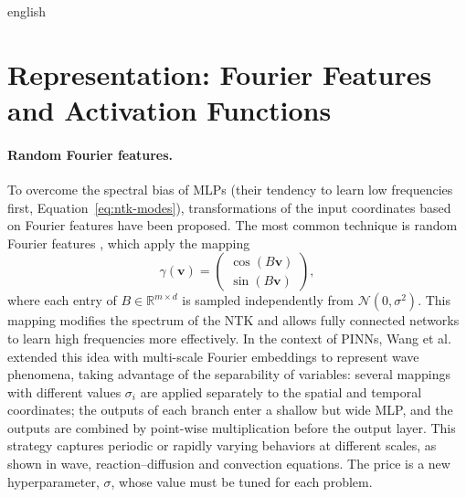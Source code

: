 \documentclass[0000.tex]{subfiles}
\begin{document}
\begin{hyphenrules}{english}
\section{Representation: Fourier Features and Activation Functions}\label{sec:representation}

\paragraph{Random Fourier features.}
To overcome the spectral bias of MLPs (their tendency to learn low frequencies first,
Equation~\eqref{eq:ntk-modes}), transformations of the input coordinates based on Fourier features have been
proposed. The most common technique is random Fourier features \cite{tancik2020}, which apply the
mapping
\begin{equation}
  \gamma(\mathbf{v})=\begin{pmatrix}\cos(B\mathbf{v})\\ \sin(B\mathbf{v})\end{pmatrix},
  \label{eq:fourier-features}
\end{equation}
where each entry of $B\in\mathbb{R}^{m\times d}$ is sampled independently from $\mathcal{N}(0,\sigma^2)$. This mapping
modifies the spectrum of the NTK and allows fully connected networks to learn high frequencies more
effectively. In the context of PINNs, Wang et al.~\cite{wang2021eigenvector} extended this idea with multi-scale
Fourier embeddings to represent wave phenomena, taking advantage of the separability of variables: several
mappings with different values $\sigma_i$ are applied separately to the spatial and temporal coordinates;
the outputs of each branch enter a shallow but wide MLP, and the outputs are combined by point-wise
multiplication before the output layer. This strategy captures periodic or rapidly varying behaviors at
different scales, as shown in wave, reaction--diffusion and convection equations. The price is a new
hyperparameter, $\sigma$, whose value must be tuned for each problem.


\end{hyphenrules}
\end{document}
